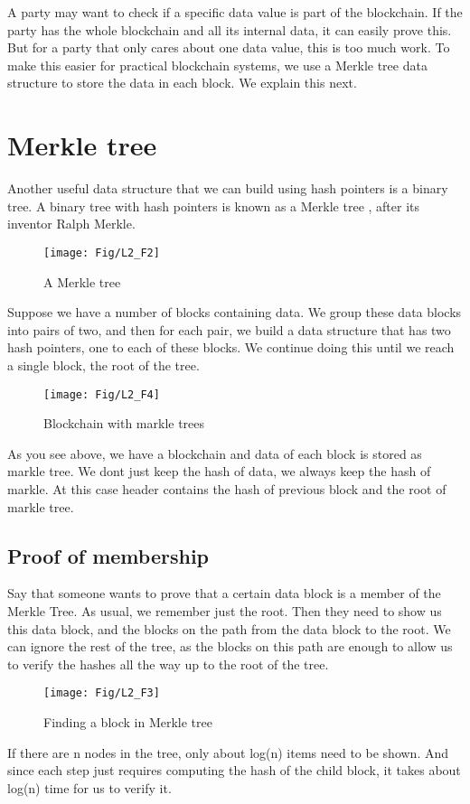 A party may want to check if a specific data value is part of the blockchain. If the party has the whole blockchain and all its internal data, it can easily prove this. But for a party that only cares about one data value, this is too much work. To make this easier for practical blockchain systems, we use a Merkle tree data structure to store the data in each block. We explain this next.
\section{Merkle tree}
Another useful data structure that we can build using hash pointers is a binary tree. A binary tree with hash pointers is known as a Merkle tree , after its inventor Ralph Merkle.
\begin{figure}[h!]
	\centering
	\texttt{[image: Fig/L2\_F2]}
	\caption{A Merkle tree}
	\label{fig:l2_f2}
\end{figure}
Suppose we have a number of blocks containing data. We group these data blocks into pairs of two, and then for each pair, we build a data structure that has two hash pointers, one to each of these blocks. We continue doing this until we reach a single block, the root of the tree.

\begin{figure}[h!]
	\centering
	\texttt{[image: Fig/L2\_F4]}
	\caption{Blockchain with markle trees}
	\label{fig:l2_f4}
\end{figure}

As you see above, we have a blockchain and data of each block is stored as markle tree. We dont just keep the hash of data, we always keep the hash of markle. At this case header contains the hash of previous block and the root of markle tree.

\subsection*{Proof of membership}
Say that someone wants to prove that a certain data block is a member of the Merkle Tree. As usual, we remember just the root. Then they need to show us this data block, and the blocks on the path from the data block to the root. We can ignore the rest of the tree, as the blocks on this path are enough to allow us to verify the hashes all the way up to the root of the tree.
\begin{center}
	\begin{figure}[h!]
		\centering
		\texttt{[image: Fig/L2\_F3]}
		\caption{Finding a block in Merkle tree}
		\label{fig:l2_f3}
	\end{figure}
\end{center}
If there are n nodes in the tree, only about log(n) items need to be shown. And since each step just requires computing the hash of the child block, it takes about log(n) time for us to verify it.

